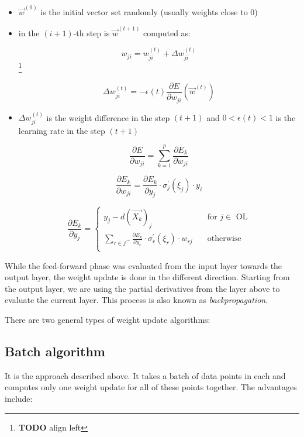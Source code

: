 \begin{itemize}

\item $\overrightarrow{w}^{(0)}$ is the initial vector set randomly (usually weights close to 0)
\item in the $(i+1)$-th step is $\overrightarrow{w}^{(t+1)}$ computed as:

$$ w_{ji} = w_{ji}^{(t)} + \Delta w_{ji}^{(t)} $$\footnote{\textbf{TODO} align left}
 
$$ \Delta w_{ji}^{(t)} = - \epsilon(t) \frac{\partial E}{\partial w_{ji}}(\overrightarrow{w}^{(t)})$$

\item $\Delta w_{ji}^{(t)}$ is the weight difference in the step $(t+1)$ and $0 < \epsilon(t) < 1$ is the learning rate in the step $(t+1)$

$$  \frac{\partial E}{\partial w_{ji}} = \sum_{k=1}^p  \frac{\partial E_k}{\partial w_{ji}} $$

$$  \frac{\partial E_k}{\partial w_{ji}} =  \frac{\partial E_k}{\partial y_j} \cdot \sigma_{j}^{'}(\xi_j) \cdot y_i$$

\[   
\frac{\partial E_k}{\partial y_j}  = 
     \begin{cases}
       y_j - d(\overrightarrow{X_k})_j & \quad\text{for } j \in \text{ OL} \\
       \sum_{r \in j^{\rightarrow}} \frac{\partial E_k}{\partial y_r} \cdot \sigma_{r}^{'}(\xi_r) \cdot w_{rj} & \quad\text{otherwise} \\
     \end{cases}
\]

\end{itemize}

\noindent
While the feed-forward phase was evaluated from the input layer towards the output layer, the weight update is done in the different direction. Starting from the output layer, we are using the partial derivatives from the layer above to evaluate the current layer. This process is also known as \textit{backpropagation}.

There are two general types of weight update algorithms:

\subsection*{Batch algorithm}

It is the approach described above. It takes a batch of data points in each and computes only one weight update for all of these points together. The advantages include:

